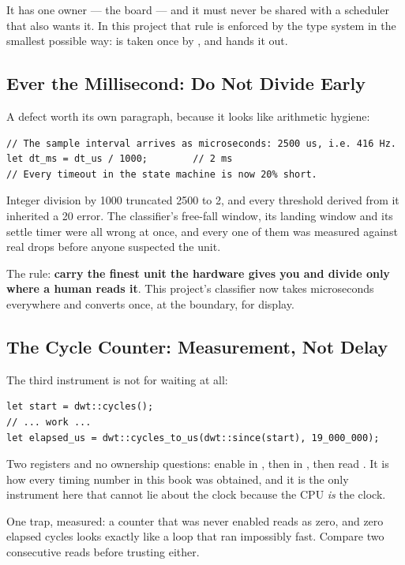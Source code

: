 It has one owner — the board — and it must never be shared with a scheduler that also wants it. In
this project that rule is enforced by the type system in the smallest possible way: 
is taken once by , and  hands it out.

\subsection{Ever the Millisecond: Do Not Divide Early}

A defect worth its own paragraph, because it looks like arithmetic hygiene:

\begin{verbatim}
// The sample interval arrives as microseconds: 2500 us, i.e. 416 Hz.
let dt_ms = dt_us / 1000;        // 2 ms
// Every timeout in the state machine is now 20% short.
\end{verbatim}

Integer division by 1000 truncated 2500 to 2, and every threshold derived from it inherited a 20%
error. The classifier's free-fall window, its landing window and its settle timer were all wrong at
once, and every one of them was measured against real drops before anyone suspected the unit.

The rule: \textbf{carry the finest unit the hardware gives you and divide only where a human reads
it}. This project's classifier now takes microseconds everywhere and converts once, at the boundary,
for display.

\subsection{The Cycle Counter: Measurement, Not Delay}

The third instrument is not for waiting at all:

\begin{verbatim}
let start = dwt::cycles();
// ... work ...
let elapsed_us = dwt::cycles_to_us(dwt::since(start), 19_000_000);
\end{verbatim}

Two registers and no ownership questions: enable  in , then
 in , then read . It is how every
timing number in this book was obtained, and it is the only instrument here that cannot lie about
the clock because the CPU \emph{is} the clock.

One trap, measured: a counter that was never enabled reads as zero, and zero elapsed cycles looks
exactly like a loop that ran impossibly fast. Compare two consecutive reads before trusting either.
